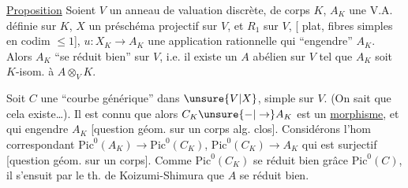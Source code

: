 \uline{Proposition} Soient $V$ un anneau de valuation discrète,
de corps $K$, $A_K$ une V.A. définie sur $K$,
$X$ un préschéma projectif sur $V$, et $R_1$ sur $V$,
[ plat, fibres simples en codim $\leq 1$],
$u:X_K\to A_K$ une application rationnelle qui
``engendre'' $A_K$. Alors $A_K$ ``se réduit bien''
sur $V$, i.e. il existe un $A$ abélien sur
$V$ tel que $A_K$ soit $K$-isom. à $A\otimes_V K$.

 Soit $C$ une ``courbe
générique'' dans $\unsure{V|X}$,  simple sur
$V$. (On sait que cela existe\ldots).  Il est connu que alors
$C_K\unsure{-|\to}A_K$ est un \uline{morphisme}, et
qui engendre $A_K$ [question géom. sur
un corps alg. clos]. Considérons l'hom
correspondant $\mathrm{Pic}^0(A_K)\to\mathrm{Pic}^0(C_K)$,  
$\mathrm{Pic}^0(C_K)\to A_K$
qui est surjectif [question géom. sur
un corps]. Comme $\mathrm{Pic}^0(C_K)$ se
réduit bien grâce  $\mathrm{Pic}^0(C)$, il s'ensuit
 par le th. de Koizumi-Shimura
que  $A$ se réduit bien.
